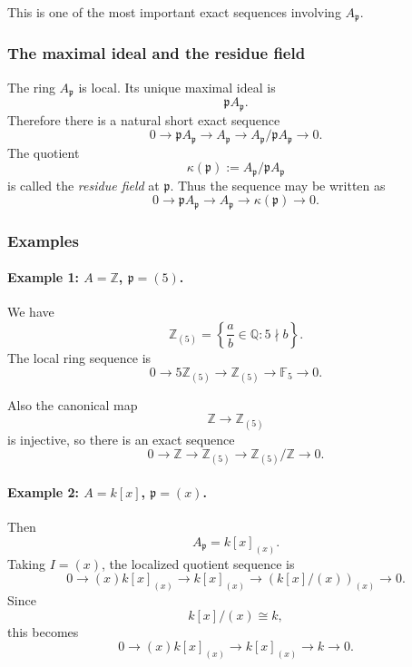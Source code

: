 \documentclass[12pt,a4paper]{article}
\theoremstyle{notespace}
\theoremstyle{definition}
\begin{document}
This is one of the most important exact sequences involving \(A_{\mathfrak p}\).

\subsubsection{The maximal ideal and the residue field}

The ring \(A_{\mathfrak p}\) is local. Its unique maximal ideal is
\[
\mathfrak p A_{\mathfrak p}.
\]
Therefore there is a natural short exact sequence
\[
0
\longrightarrow
\mathfrak p A_{\mathfrak p}
\longrightarrow
A_{\mathfrak p}
\longrightarrow
A_{\mathfrak p}/\mathfrak p A_{\mathfrak p}
\longrightarrow
0.
\]
The quotient
\[
\kappa(\mathfrak p):=A_{\mathfrak p}/\mathfrak p A_{\mathfrak p}
\]
is called the \emph{residue field} at \(\mathfrak p\). Thus the sequence may be written as
\[
0
\longrightarrow
\mathfrak p A_{\mathfrak p}
\longrightarrow
A_{\mathfrak p}
\longrightarrow
\kappa(\mathfrak p)
\longrightarrow
0.
\]

\subsubsection{Examples}

\paragraph{Example 1: \(A=\mathbb Z\), \(\mathfrak p=(5)\).}

We have
\[
\mathbb Z_{(5)}
=
\left\{
\frac{a}{b}\in \mathbb Q : 5\nmid b
\right\}.
\]
The local ring sequence is
\[
0
\longrightarrow
5\mathbb Z_{(5)}
\longrightarrow
\mathbb Z_{(5)}
\longrightarrow
\mathbb F_{5}
\longrightarrow
0.
\]

Also the canonical map
\[
\mathbb Z\longrightarrow \mathbb Z_{(5)}
\]
is injective, so there is an exact sequence
\[
0
\longrightarrow
\mathbb Z
\longrightarrow
\mathbb Z_{(5)}
\longrightarrow
\mathbb Z_{(5)}/\mathbb Z
\longrightarrow
0.
\]

\paragraph{Example 2: \(A=k[x]\), \(\mathfrak p=(x)\).}

Then
\[
A_{\mathfrak p}=k[x]_{(x)}.
\]
Taking \(I=(x)\), the localized quotient sequence is
\[
0
\longrightarrow
(x)k[x]_{(x)}
\longrightarrow
k[x]_{(x)}
\longrightarrow
(k[x]/(x))_{(x)}
\longrightarrow
0.
\]
Since
\[
k[x]/(x)\cong k,
\]
this becomes
\[
0
\longrightarrow
(x)k[x]_{(x)}
\longrightarrow
k[x]_{(x)}
\longrightarrow
k
\longrightarrow
0.
\]
\end{document}
